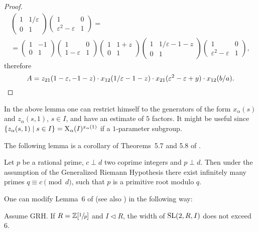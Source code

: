 \begin{proof}
\begin{multline*}
\begin{pmatrix} 1 & 1/\varepsilon \\ 0 & 1 \end{pmatrix}
\begin{pmatrix} 1 & 0 \\ \varepsilon^2-\varepsilon & 1 \end{pmatrix} =\\=
\begin{pmatrix} 1 & -1 \\ 0 & 1 \end{pmatrix}
\begin{pmatrix} 1 & 0 \\ 1-\varepsilon & 1 \end{pmatrix}
\begin{pmatrix} 1 & 1+z \\ 0 & 1 \end{pmatrix}
\begin{pmatrix} 1 & 1/\varepsilon-1-z \\ 0 & 1 \end{pmatrix}
\begin{pmatrix} 1 & 0 \\ \varepsilon^2-\varepsilon & 1 \end{pmatrix},
\end{multline*}
therefore
\[
A=z_{21}(1-\varepsilon,-1-z)\cdot x_{12}(1/\varepsilon-1-z)\cdot x_{21}(\varepsilon^2-\varepsilon+y)\cdot x_{12}(b/a). \qedhere
\]
\end{proof}
\begin{rem}
In the above lemma one can restrict himself to the generators of the form $x_\alpha(s)$ and $z_\alpha(s,1)$, $s\in I$, and have an estimate of $5$ factors. It might be useful since $\left\{z_\alpha(s,1)\mid s\in I\right\}=\operatorname{X}_\alpha(I)^{x_\alpha(1)}$ if a $1$-parameter subgroup.
\end{rem}
The following lemma is a corollary of Theorems~5.7 and 5.8 of \cite{LenMorStePrimitiveRoot}.
\begin{lemma}
Let $p$ be a rational prime, $c\perp d$ two coprime integers and $p\perp d$. Then under the assumption of the Generalized Riemann Hypothesis there exist infinitely many primes $q\equiv c\pmod{d}$, such that $p$ is a primitive root modulo $q$.
\end{lemma}
One can modify Lemma~6 of \cite{VavSmSuUnitrEng} (see also \cite{VseUnitrZ1p}) in the following way:
\begin{lemma}\label{lemma:Z1p}
Assume GRH. If $R=\mathbb{Z}[\sfrac{1}{p}]$ and $I\lhd R$, the width of $\operatorname{SL}(2,R,I)$ does not exceed $6$.
\end{lemma}
